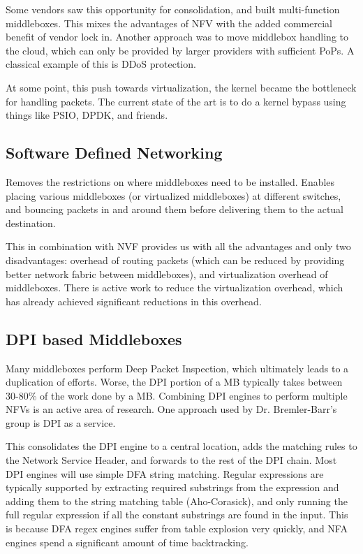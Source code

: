 \documentclass{idc_msc}
\begin{document}
Some vendors saw this opportunity for consolidation, and built multi-function middleboxes.
This mixes the advantages of NFV with the added commercial benefit of vendor lock in.
Another approach was to move middlebox handling to the cloud, which can only be provided by larger providers with sufficient PoPs.
A classical example of this is DDoS protection.

At some point, this push towards virtualization, the kernel became the bottleneck for handling packets.
The current state of the art is to do a kernel bypass using things like PSIO, DPDK, and friends.

\subsection{Software Defined Networking}

Removes the restrictions on where middleboxes need to be installed.
Enables placing various middleboxes (or virtualized middleboxes) at different switches, and bouncing packets in and around them before delivering them to the actual destination.

This in combination with NVF provides us with all the advantages and only two disadvantages: overhead of routing packets (which can be reduced by providing better network fabric between middleboxes), and virtualization overhead of middleboxes.
There is active work to reduce the virtualization overhead, which has already achieved significant reductions in this overhead.

\subsection{DPI based Middleboxes}

Many middleboxes perform Deep Packet Inspection, which ultimately leads to a duplication of efforts.
Worse, the DPI portion of a MB typically takes between 30-80\% of the work done by a MB.
Combining DPI engines to perform multiple NFVs is an active area of research.
One approach used by Dr. Bremler-Barr's group is DPI as a service.

This consolidates the DPI engine to a central location, adds the matching rules to the Network Service Header, and forwards to the rest of the DPI chain.
Most DPI engines will use simple DFA string matching.
Regular expressions are typically supported by extracting required substrings from the expression and adding them to the string matching table (Aho-Corasick), and only running the full regular expression if all the constant substrings are found in the input.
This is because DFA regex engines suffer from table explosion very quickly, and NFA engines spend a significant amount of time backtracking.
\end{document}
